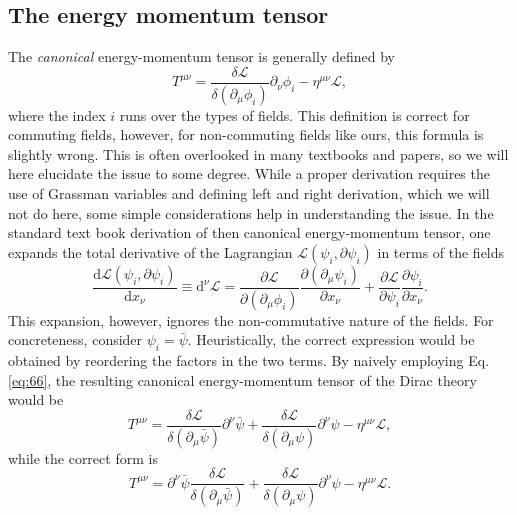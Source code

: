 \subsection{The energy momentum tensor}
The \emph{canonical} energy-momentum tensor is generally defined by
\begin{equation}
  \label{eq:66}
  T^{\mu \nu} =  \frac{\delta \mathcal{L}}{\delta(\partial_{\mu} \phi_{i})} \partial_{\nu} \phi_i - \eta^{\mu \nu} \mathcal{L},
\end{equation}
where the index \( i \) runs over the types of fields.
This definition is correct for commuting fields, however, for non-commuting fields like ours, this formula is slightly wrong.
This is often overlooked in many textbooks and papers, so we will here elucidate the issue to some degree.
While a proper derivation requires the use of Grassman variables and defining left and right derivation, which we will not do here, some simple considerations help in understanding the issue.
In the standard text book derivation of then canonical energy-momentum tensor, one expands the total derivative of the Lagrangian \( \mathcal{L}(\psi_i, \partial \psi_i)\) in terms of the fields
\begin{equation}
  \label{eq:67}
  \frac{\mathrm{d} \mathcal{L}(\psi_{i}, \partial \psi_i)}{\mathrm{d} x_{\nu }} \equiv \mathrm{d}^{\nu } \mathcal{L}
  = \frac{\partial \mathcal{L}}{\partial (\partial_{\mu } \phi_i)} \frac{\partial(\partial _{\mu } \psi_i)}{\partial x_{\nu }}
  + \frac{\partial \mathcal{L}}{\partial \psi _{i}} \frac{\partial \psi_i}{\partial x_{\nu }}.
\end{equation}
This expansion, however, ignores the non-commutative nature of the fields.
For concreteness, consider \( \psi _i = \bar{\psi} \).
Heuristically, the correct expression would be obtained by reordering the factors in the two terms.
By naively employing Eq. \eqref{eq:66}, the resulting canonical energy-momentum tensor of the Dirac theory would be
\begin{equation}
  T^{\mu \nu} = \frac{\delta \mathcal{L}}{\delta (\partial_{\mu} \bar{\psi})} \partial^{\nu} \bar{\psi}  + \frac{\delta \mathcal{L}}{\delta (\partial_{\mu} \psi)} \partial^{\nu} \psi - \eta^{\mu \nu} \mathcal{L},
\end{equation}
while the correct form is \cite[Eq.~3-153]{itzyksonQuantumFieldTheory1980}
\begin{equation}
  \label{eq:68}
  T^{\mu \nu} = \partial^{\nu} \bar{\psi} \frac{\delta \mathcal{L}}{\delta (\partial_{\mu} \bar{\psi})} + \frac{\delta \mathcal{L}}{\delta (\partial_{\mu} \psi)} \partial^{\nu} \psi - \eta^{\mu \nu} \mathcal{L}.
\end{equation}

